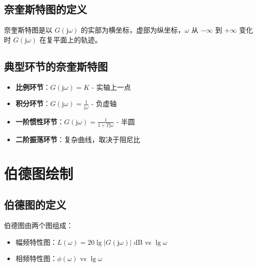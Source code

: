 \documentclass[12pt,a4paper]{article}
\newcommand{\jw}{\mathrm{j}\omega}
\begin{document}
\subsection{奈奎斯特图的定义}
奈奎斯特图是以 $G(\jw)$ 的实部为横坐标，虚部为纵坐标，$\omega$ 从 $-\infty$ 到 $+\infty$ 变化时 $G(\jw)$ 在复平面上的轨迹。

\subsection{典型环节的奈奎斯特图}
\begin{itemize}
    \item \textbf{比例环节}：$G(\jw) = K$ - 实轴上一点
    \item \textbf{积分环节}：$G(\jw) = \frac{1}{\jw}$ - 负虚轴
    \item \textbf{一阶惯性环节}：$G(\jw) = \frac{1}{1+T\jw}$ - 半圆
    \item \textbf{二阶振荡环节}：复杂曲线，取决于阻尼比
\end{itemize}

\section{伯德图绘制}

\subsection{伯德图的定义}
伯德图由两个图组成：
\begin{itemize}
    \item 幅频特性图：$L(\omega) = 20\lg|G(\jw)|$ dB vs $\lg\omega$
    \item 相频特性图：$\phi(\omega)$ vs $\lg\omega$
\end{itemize}
\end{document}
